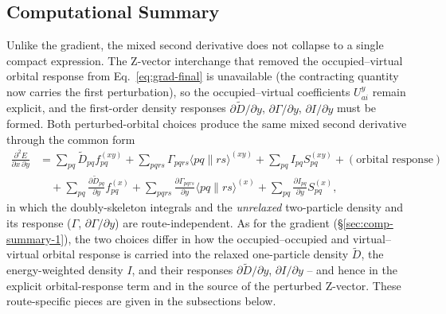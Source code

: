 \documentclass[12pt]{article}
\newcommand{\adb}[2]{\langle #1 \| #2 \rangle}
\begin{document}
\subsection{Computational Summary}
\label{sec:comp-summary-2}

Unlike the gradient, the mixed second derivative does not collapse to a single
compact expression.  The Z-vector interchange that removed the occupied--virtual
orbital response from Eq.~\eqref{eq:grad-final} is unavailable (the contracting
quantity now carries the first perturbation), so the occupied--virtual
coefficients $U^y_{ai}$ remain explicit, and the first-order density responses
$\partial\tilde D/\partial y$, $\partial\Gamma/\partial y$, $\partial I/\partial y$
must be formed.  Both perturbed-orbital choices produce the same mixed second
derivative through the common form
\begin{align*}
\frac{\partial^2 E}{\partial x\,\partial y}
&= \sum_{pq}\tilde D_{pq}f^{(xy)}_{pq}
+ \sum_{pqrs}\Gamma_{pqrs}\adb{pq}{rs}^{(xy)}
+ \sum_{pq}I_{pq}S^{(xy)}_{pq}
+ (\text{orbital response})
\\
&\quad
+ \sum_{pq}\frac{\partial\tilde D_{pq}}{\partial y}f^{(x)}_{pq}
+ \sum_{pqrs}\frac{\partial\Gamma_{pqrs}}{\partial y}\adb{pq}{rs}^{(x)}
+ \sum_{pq}\frac{\partial I_{pq}}{\partial y}S^{(x)}_{pq},
\end{align*}
in which the doubly-skeleton integrals and the {\em unrelaxed} two-particle
density and its response ($\Gamma$, $\partial\Gamma/\partial y$) are
route-independent.  As for the gradient (\S\ref{sec:comp-summary-1}), the two
choices differ in how the occupied--occupied and virtual--virtual orbital response
is carried into the relaxed one-particle density $\tilde D$, the energy-weighted
density $I$, and their responses $\partial\tilde D/\partial y$, $\partial
I/\partial y$ -- and hence in the explicit orbital-response term and in the source
of the perturbed Z-vector.  These route-specific pieces are given in the
subsections below.
\end{document}
